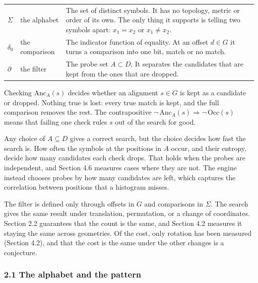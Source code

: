 \begin{center}
  \begin{tabular}{@{}p{2.2em}p{7.5em}p{}@{}}
    \toprule
    \(\Sigma\)   & the alphabet    &
      The set of distinct symbols. It has no topology, metric or order of its own. The only thing
      it supports is telling two symbols apart: \(x_1 = x_2\) or \(x_1 \neq x_2\). \\
    \addlinespace[0.7em]
    \(\delta_0\) & the comparison &
      The indicator function of equality. At an offset \(d \in G\) it turns a comparison into one
      bit, match or no match. \\
    \addlinespace[0.7em]
    \(\partial\) & the filter    &
      The probe set \(A \subset D\). It separates the candidates that are kept from the ones that
      are dropped. \\
    \bottomrule
  \end{tabular}
\end{center}

Checking \(\mathrm{Anc}_A(s)\) decides whether an alignment \(s \in G\) is kept as a candidate or
dropped. Nothing true is lost: every true match is kept, and the full comparison removes the rest. The contrapositive \(\neg\,\mathrm{Anc}_A(s) \Longrightarrow \neg\,\mathrm{Occ}(s)\) means
that failing one check rules \(s\) out of the search for good.

Any choice of \(A \subseteq D\) gives a correct search, but the choice decides how fast the search
is. How often the symbols at the positions in \(A\) occur, and their entropy, decide how many
candidates each check drops. That holds when the probes are independent, and Section 4.6 measures
cases where they are not. The engine instead chooses probes by how many candidates are left, which
captures the correlation between positions that a histogram misses.

The filter is defined only through offsets in \(G\) and comparisons in \(\Sigma\). The search
gives the same result under translation, permutation, or a change of coordinates. Section 2.2
guarantees that the count is the same, and Section 4.2 measures it staying the same across
geometries. Of the cost, only rotation has been measured (Section 4.2), and that the cost is the
same under the other changes is a conjecture.

\subsubsection{2.1 The alphabet and the pattern}

